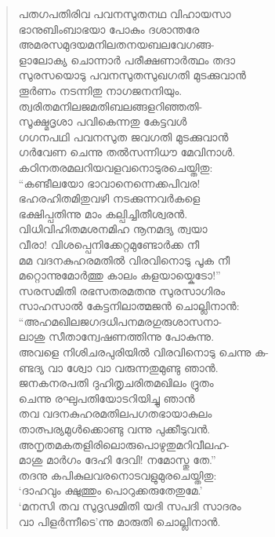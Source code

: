 \begin{verse}
പതഗപതിരിവ പവനസുതനഥ വിഹായസാ\\
ഭാനുബിംബാഭയാ പോകും ദശാന്തരേ\\
അമരസമുദയമനിലതനയബലവേഗങ്ങ-\\
ളാലോക്യ ചൊന്നാര്‍ പരീക്ഷണാര്‍ത്ഥം തദാ\\
സുരസയൊടു പവനസുതസുഖഗതി മുടക്കുവാന്‍\\
തൂര്‍ണം നടന്നിതു നാഗജനനിയും.\\
ത്വരിതമനിലജമതിബലങ്ങളറിഞ്ഞതി-\\
സൂക്ഷ്മദൃശാ പവികെന്നതു കേട്ടവള്‍\\
ഗഗനപഥി പവനസുത ജവഗതി മുടക്കുവാന്‍\\
ഗര്‍വേണ ചെന്നു തല്‍സന്നിധൗ മേവിനാള്‍.\\
കഠിനതരമലറിയവളവനൊടുരചെയ്തിതു:\\
“കണ്ടീലയോ ഭാവാനെന്നെക്കപിവര!\\
ഭഹരഹിതമിതുവഴി നടക്കുന്നവര്‍കളെ\\
ഭക്ഷിപ്പതിന്നു മാം കല്പിച്ചിതീശ്വരന്‍.\\
വിധിവിഹിതമശനമിഹ നൂനമദ്യ ത്വയാ\\
വീരാ! വിശപ്പെനിക്കേറ്റമുണ്ടോര്‍ക്ക നീ\\
മമ വദനകുഹരമതില്‍ വിരവിനൊടു പൂക നീ\\
മറ്റൊന്നുമോര്‍ത്തു കാലം കളയായ്കെടോ!”\\
സരസമിതി രഭസതരമതനു സുരസാഗിരം\\
സാഹസാല്‍ കേട്ടനിലാത്മജന്‍ ചൊല്ലിനാന്‍:\\
“അഹമഖിലജഗദധിപനമരഗുരുശാസനാ-\\
ലാശു സീതാന്വേഷണത്തിന്നു പോകുന്നു.\\
അവളെ നിശിചരപുരിയില്‍ വിരവിനൊടു ചെന്നു ക-\\
ണ്ടദ്യ വാ ശ്വോ വാ വരുന്നതുമുണ്ടു ഞാന്‍.\\
ജനകനരപതി ദുഹിതൃചരിതമഖിലം ദ്രുതം\\
ചെന്നു രഘുപതിയോടറിയിച്ചു ഞാന്‍\\
തവ വദനകുഹരമതിലപഗതഭായാകുലം\\
താത്പര്യമുള്‍ക്കൊണ്ടു വന്നു പുക്കീടുവന്‍.\\
അനൃതമകതളിരിലൊരുപൊഴുതുമറിവീലഹ-\\
മാശു മാര്‍ഗം ദേഹി ദേവി! നമോസ്തു തേ.”\\
തദനു കപികുലവരനൊടവളുമുരചെയ്തിതു:\\
‘ദാഹവും ക്ഷുത്തും പൊറുക്കരുതേതുമേ.’\\
‘മനസി തവ സുദൃഢമിതി യദി സപദി സാദരം\\
വാ പിളര്‍ന്നീടെ’ന്നു മാരുതി ചൊല്ലിനാന്‍.\\

\end{verse}
